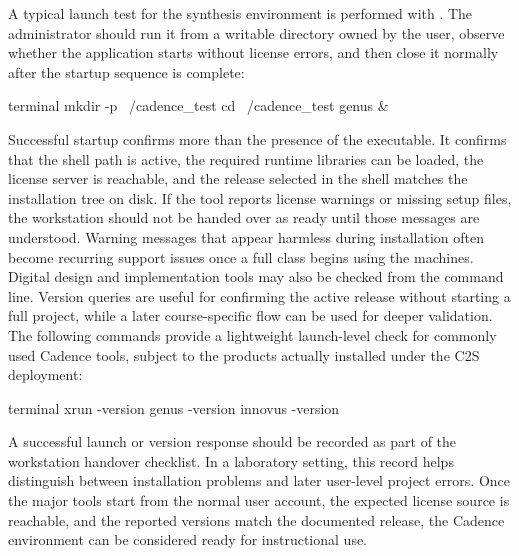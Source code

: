 \noindent A typical launch test for the synthesis environment is performed with
. The administrator should run it from a writable directory owned by the user,
observe whether the application starts without license errors, and then close it normally after the
startup sequence is complete:

\begin{codeblock}{terminal}
mkdir -p ~/cadence_test
cd ~/cadence_test
genus &
\end{codeblock}

\noindent Successful startup confirms more than the presence of the  executable.
It confirms that the shell path is active, the required runtime libraries can be loaded, the license
server is reachable, and the release selected in the shell matches the installation tree on disk. If
the tool reports license warnings or missing setup files, the workstation should not be handed over
as ready until those messages are understood. Warning messages that appear harmless during
installation often become recurring support issues once a full class begins using the machines.\\

\noindent Digital design and implementation tools may also be checked from the command line. Version
queries are useful for confirming the active release without starting a full project, while a later
course-specific flow can be used for deeper validation. The following commands provide a lightweight
launch-level check for commonly used Cadence tools, subject to the products actually installed under
the C2S deployment:

\begin{codeblock}{terminal}
xrun -version
genus -version
innovus -version
\end{codeblock}

\noindent A successful launch or version response should be recorded as part of the workstation
handover checklist. In a laboratory setting, this record helps distinguish between installation
problems and later user-level project errors. Once the major tools start from the normal user
account, the expected license source is reachable, and the reported versions match the documented
release, the Cadence environment can be considered ready for instructional use.
